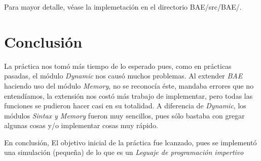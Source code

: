 \documentclass[12pt, letterpaper]{article}
\begin{document}
    Para mayor detalle, véase la implemetación en el directorio BAE/src/BAE/.

    \section*{Conclusión}
    La práctica nos tomó más tiempo de lo esperado pues, como en prácticas pasadas,
    el módulo \textit{Dynamic} nos causó muchos problemas. Al extender \textit{BAE} haciendo uso
    del módulo  \textit{Memory}, no se reconocía éste, mandaba errores que no entendíamos, 
    la extensión nos costó más trabajo de implementar, pero todas las funciones se pudieron hacer
    casi en su totalidad. A diferencia de \textit{Dynamic}, los módulos \textit{Sintax y Memory} fueron muy sencillos,
    pues sólo bastaba con gregar algunas cosas y/o implementar cosas muy rápido. \vspace{.3cm}

    En conclusión, El objetivo inicial de la práctica fue lcanzado, pues se implementó una simulación 
    (pequeña) de lo que es un \textit{Leguaje de programación impertivo}  
\end{document}
